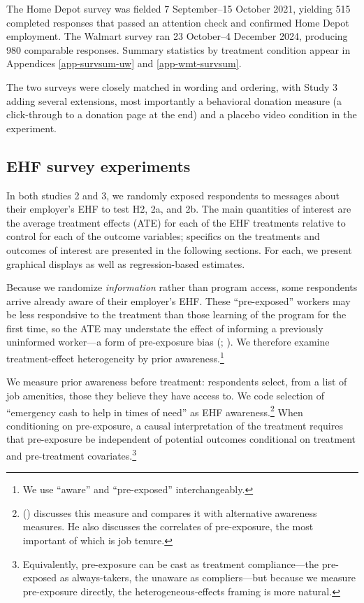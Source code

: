 \documentclass[
  11pt,
  oneside]{article}
\begin{document}
The Home Depot survey was fielded 7 September--15 October 2021, yielding 515 completed responses that passed an attention check and confirmed Home Depot employment. The Walmart survey ran 23 October--4 December 2024, producing 980 comparable responses. Summary statistics by treatment condition appear in Appendices \ref{app-survsum-uw} and \ref{app-wmt-survsum}.

The two surveys were closely matched in wording and ordering, with Study 3 adding several extensions, most importantly a behavioral donation measure (a click-through to a donation page at the end) and a placebo video condition in the experiment.

\subsection{EHF survey experiments}\label{ehf-survey-experiments}

In both studies 2 and 3, we randomly exposed respondents to messages about their employer's EHF to test H2, 2a, and 2b. The main quantities of interest are the average treatment effects (ATE) for each of the EHF treatments relative to control for each of the outcome variables; specifics on the treatments and outcomes of interest are presented in the following sections. For each, we present graphical displays as well as regression-based estimates.

Because we randomize \emph{information} rather than program access, some respondents arrive already aware of their employer's EHF. These ``pre-exposed'' workers may be less respondsive to the treatment than those learning of the program for the first time, so the ATE may understate the effect of informing a previously uninformed worker---a form of pre-exposure bias (; ). We therefore examine treatment-effect heterogeneity by prior awareness.\footnote{We use ``aware'' and ``pre-exposed'' interchangeably.}

We measure prior awareness before treatment: respondents select, from a list of job amenities, those they believe they have access to. We code selection of ``emergency cash to help in times of need'' as EHF awareness.\footnote{() discusses this measure and compares it with alternative awareness measures. He also discusses the correlates of pre-exposure, the most important of which is job tenure.} When conditioning on pre-exposure, a causal interpretation of the treatment requires that pre-exposure be independent of potential outcomes conditional on treatment and pre-treatment covariates.\footnote{Equivalently, pre-exposure can be cast as treatment compliance---the pre-exposed as always-takers, the unaware as compliers---but because we measure pre-exposure directly, the heterogeneous-effects framing is more natural.}
\end{document}
